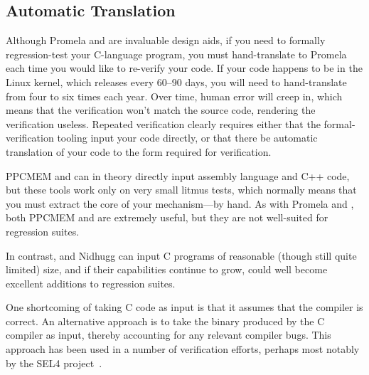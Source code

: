 \subsection{Automatic Translation}
\label{sec:future:Automatic Translation}

Although Promela and 
are invaluable design aids, if you need to formally regression-test
your C-language program, you must hand-translate to Promela each time
you would like to re-verify your code.
If your code happens to be in the Linux kernel, which releases every
60--90 days, you will need to hand-translate from four to six times
each year.
Over time, human error will creep in, which means that the verification
won't match the source code, rendering the verification useless.
Repeated verification clearly requires either that the formal-verification
tooling input your code directly, or that there be automatic translation
of your code to the form required for verification.

PPCMEM and  can in theory directly input assembly language
and C++ code, but these tools work only on very small litmus tests,
which normally means that you must extract the core of your
mechanism---by hand.
As with Promela and , both PPCMEM and  are
extremely useful, but they are not well-suited for regression suites.

In contrast,  and Nidhugg can input C programs of reasonable
(though still quite limited) size, and if their capabilities continue
to grow, could well become excellent additions to regression suites.

One shortcoming of taking C code as input is that it assumes that the
compiler is correct.
An alternative approach is to take the binary produced by the C compiler
as input, thereby accounting for any relevant compiler bugs.
This approach has been used in a number of verification efforts,
perhaps most notably by the SEL4
project~\cite{ThomasSewell2013L4binaryVerification}.

\QuickQuizEnd


